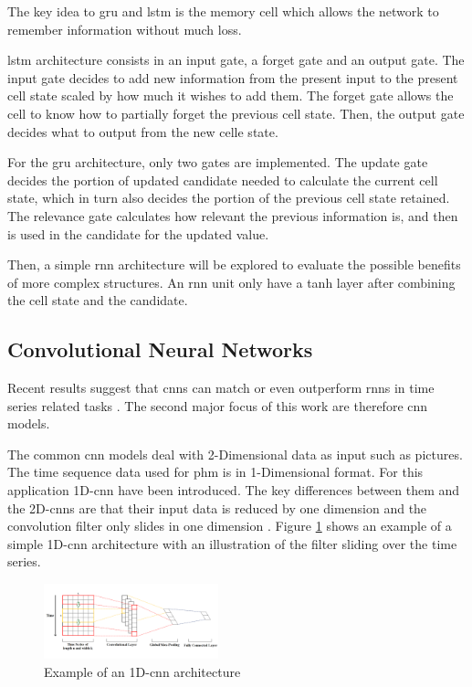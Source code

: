\documentclass[conference]{IEEEtran}
\begin{document}
The key idea to \gls{gru} and \gls{lstm} is the memory cell which allows the network to remember information without much loss.

\gls{lstm} architecture consists in an input gate, a forget gate and an output gate. The input gate decides to add new information from the present input to the present cell state scaled by how much it wishes to add them. The forget gate allows the cell to know how to partially forget the previous cell state. Then, the output gate decides what to output from the new celle state.

For the \gls{gru} architecture, only two gates are implemented. The update gate decides the portion of updated candidate needed to calculate the current cell state, which in turn also decides the portion of the previous cell state retained. The relevance gate calculates how relevant the previous information is, and then is used in the candidate for the updated value.

Then, a simple \gls{rnn} architecture will be explored to evaluate the possible benefits of more complex structures. An \gls{rnn} unit only have a tanh layer after combining the cell state and the candidate.







\subsection{Convolutional Neural Networks}
\label{sec:convolutional_neural_networks}

Recent results suggest that \glspl{cnn} can match or even outperform \glspl{rnn} in time series related tasks \cite{Bai2018}. The second major focus of this work are therefore \gls{cnn} models.

The common \gls{cnn} models deal with 2-Dimensional data as input such as pictures. The time sequence data used for \gls{phm} is in 1-Dimensional format. For this application 1D-\gls{cnn} have been introduced. The key differences between them and the 2D-\glspl{cnn} are that their input data is reduced by one dimension and the convolution filter only slides in one dimension \cite{Akrim2021}. Figure \ref{fig:1D_cnn_architecture} shows an example of a simple 1D-\gls{cnn} architecture with an illustration of the filter sliding over the time series. 

\begin{figure}[htp]
	\centering
	\includegraphics[width=0.45\textwidth]{1D_CNN_Architecture.png}
	\caption{Example of an 1D-\gls{cnn} architecture \cite{Sayyad}}
	\label{fig:1D_cnn_architecture}
\end{figure}
\end{document}
